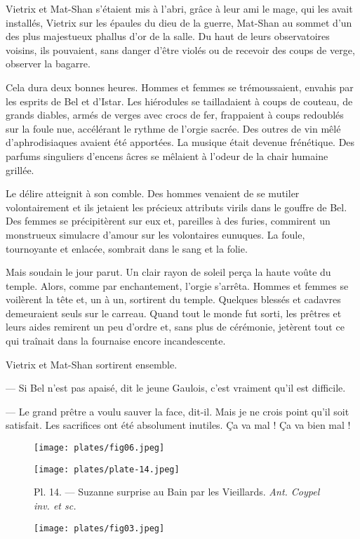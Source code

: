 \documentclass[a4paper, 11pt, oneside, polutonikogreek, french]{article}
\begin{document}
Vietrix et Mat-Shan s'étaient mis à l'abri, grâce à leur ami le mage, qui les avait installés, Vietrix sur les épaules du dieu de la guerre, Mat-Shan au sommet d'un des plus majestueux phallus d'or de la salle. Du haut de leurs observatoires voisins, ils pouvaient, sans danger d'être violés ou de recevoir des coups de verge, observer la bagarre.

Cela dura deux bonnes heures. Hommes et femmes se trémoussaient, envahis par les esprits de Bel et d'Istar. Les hiérodules se tailladaient à coups de couteau, de grands diables, armés de verges avec crocs de fer, frappaient à coups redoublés sur la foule nue, accélérant le rythme de l'orgie sacrée. Des outres de vin mêlé d'aphrodisiaques avaient été apportées. La musique était devenue frénétique. Des parfums singuliers d'encens âcres se mêlaient à l'odeur de la chair humaine grillée.

Le délire atteignit à son comble. Des hommes venaient de se mutiler volontairement et ils jetaient les précieux attributs virils dans le gouffre de Bel. Des femmes se précipitèrent sur eux et, pareilles à des furies, commirent un monstrueux simulacre d'amour sur les volontaires eunuques. La foule, tournoyante et enlacée, sombrait dans le sang et la folie.

\bigskip
\centerline{\EightStarTaper}
\centerline{\EightStarTaper\EightStarTaper}
\bigskip

Mais soudain le jour parut. Un clair rayon de soleil perça la haute voûte du temple. Alors, comme par enchantement, l'orgie s'arrêta. Hommes et femmes se voilèrent la tête et, un à un, sortirent du temple. Quelques blessés et cadavres demeuraient seuls sur le carreau. Quand tout le monde fut sorti, les prêtres et leurs aides remirent un peu d'ordre et, sans plus de cérémonie, jetèrent tout ce qui traînait dans la fournaise encore incandescente.

Vietrix et Mat-Shan sortirent ensemble.

--- Si Bel n'est pas apaisé, dit le jeune Gaulois, c'est vraiment qu'il est difficile.

--- Le grand prêtre a voulu sauver la face, dit-il. Mais je ne crois point qu'il soit satisfait. Les sacrifices ont été absolument inutiles. Ça va mal ! Ça va bien mal !

\begin{figure}[H]
\centering
\texttt{[image: plates/fig06.jpeg]}
\end{figure}
\clearpage
\begin{landscape}
\begin{figure}[H]
\centering
\texttt{[image: plates/plate-14.jpeg]}
\caption{Pl. 14. --- Suzanne surprise au Bain par les Vieillards. \emph{Ant. Coypel inv. et sc.}}
\end{figure}
\end{landscape}
\clearpage
\begin{figure}[H]
\centering
\texttt{[image: plates/fig03.jpeg]}
\end{figure}
\end{document}
